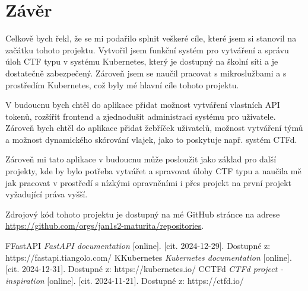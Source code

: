 \documentclass[12pt, a4paper,
oneside,      %
openright
]{report}
\begin{document}
	\chapter{Závěr}

	Celkově bych řekl, že se mi podařilo splnit veškeré cíle, které jsem si stanovil na začátku tohoto projektu. Vytvořil jsem funkční systém pro vytváření a správu úloh CTF typu v systému Kubernetes, který je dostupný na školní síti a je dostatečně zabezpečený. Zároveň jsem se naučil pracovat s mikroslužbami a s prostředím Kubernetes, což byly mé hlavní cíle tohoto projektu.

	V budoucnu bych chtěl do aplikace přidat možnost vytváření vlastních API tokenů, rozšířit frontend a zjednodušit administraci systému pro uživatele. Zároveň bych chtěl do aplikace přidat žebříček uživatelů, možnost vytváření týmů a možnost dynamického skórování vlajek, jako to poskytuje např. systém CTFd.

	Zároveň mi tato aplikace v budoucnu může posloužit jako základ pro další projekty, kde by bylo potřeba vytvářet a spravovat úlohy CTF typu a naučila mě jak pracovat v prostředí s nízkými opravněními i přes projekt na první projekt vyžadující práva vyšší.

	Zdrojový kód tohoto projektu je dostupný na mé GitHub stránce na adrese \url{https://github.com/orgs/jan1s2-maturita/repositories}.
	
	\renewcommand{\bibname}{Seznam použitých zdrojů}
	\begin{thebibliography}{99}
		\bibitem FFastAPI \textit{FastAPI documentation} [online]. [cit. 2024-12-29]. Dostupné z: https://fastapi.tiangolo.com/
		\bibitem KKubernetes \textit{Kubernetes documentation} [online]. [cit. 2024-12-31]. Dostupné z: https://kubernetes.io/
		\bibitem CCTFd \textit{CTFd project - inspiration} [online]. [cit. 2024-11-21]. Dostupné z: https://ctfd.io/
	\end{thebibliography}
	
	
	
	\appendix %
	
	[\vspace{-22pt}] %
	
	
	
	
\end{document}
